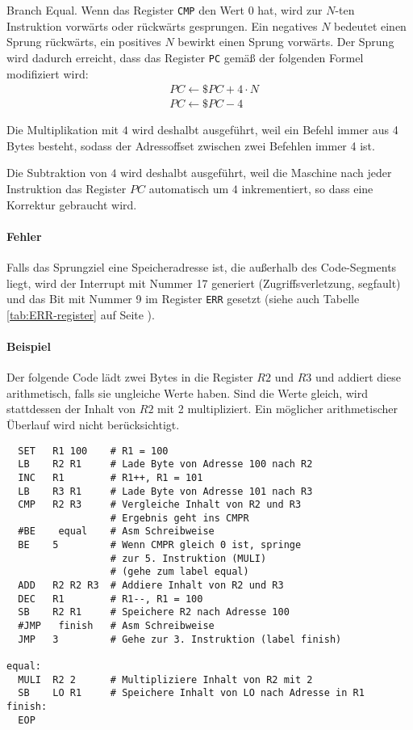 \glqq Branch Equal\grqq.
Wenn das Register \texttt{CMP} den Wert $0$ hat, wird zur $N$-ten Instruktion
vorwärts oder rückwärts gesprungen. Ein negatives $N$ bedeutet einen Sprung
rückwärts, ein positives $N$ bewirkt einen Sprung vorwärts. Der Sprung wird
dadurch erreicht, dass das Register \texttt{PC} gemäß der folgenden Formel
modifiziert wird:
\begin{align*}
   & PC \gets \$PC + 4 \cdot N \\
   & PC \gets \$PC - 4
\end{align*}

Die Multiplikation mit $4$ wird deshalbt ausgeführt, weil ein Befehl immer aus 4
Bytes besteht, sodass der Adressoffset zwischen zwei Befehlen immer 4 ist.

Die Subtraktion von $4$ wird deshalbt ausgeführt, weil die Maschine nach jeder
Instruktion das Register $PC$ automatisch um $4$ inkrementiert, so dass eine
Korrektur gebraucht wird.

\paragraph{Fehler}
Falls das Sprungziel eine Speicheradresse ist, die außerhalb des Code-Segments
liegt, wird der Interrupt mit Nummer 17 generiert (Zugriffsverletzung, segfault)
und das Bit mit Nummer 9 im Register \texttt{ERR} gesetzt (siehe auch Tabelle
\ref{tab:ERR-register} auf Seite \pageref{tab:ERR-register}).


\paragraph{Beispiel}
Der folgende Code lädt zwei Bytes in die Register $R2$ und $R3$ und addiert
diese arithmetisch, falls sie ungleiche Werte haben. Sind die Werte gleich,
wird stattdessen der Inhalt von $R2$ mit 2 multipliziert. Ein möglicher
arithmetischer Überlauf wird nicht berücksichtigt.
\begin{lstlisting}
  SET   R1 100    # R1 = 100
  LB    R2 R1     # Lade Byte von Adresse 100 nach R2
  INC   R1        # R1++, R1 = 101
  LB    R3 R1     # Lade Byte von Adresse 101 nach R3
  CMP   R2 R3     # Vergleiche Inhalt von R2 und R3
                  # Ergebnis geht ins CMPR
  #BE    equal    # Asm Schreibweise
  BE    5         # Wenn CMPR gleich 0 ist, springe
                  # zur 5. Instruktion (MULI)
                  # (gehe zum label equal)
  ADD   R2 R2 R3  # Addiere Inhalt von R2 und R3
  DEC   R1        # R1--, R1 = 100
  SB    R2 R1     # Speichere R2 nach Adresse 100
  #JMP   finish   # Asm Schreibweise
  JMP   3         # Gehe zur 3. Instruktion (label finish)

equal:
  MULI  R2 2      # Multipliziere Inhalt von R2 mit 2
  SB    LO R1     # Speichere Inhalt von LO nach Adresse in R1
finish:
  EOP
\end{lstlisting}



